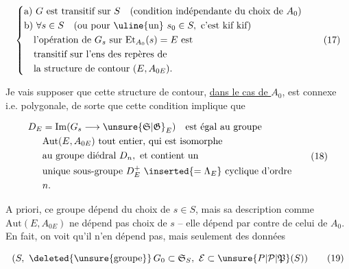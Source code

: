 \[
\left\{\begin{aligned}
 &\text{a) }G\text{ est transitif sur }S\quad\text{(condition indépendante du choix de }A_0\text{)}\\
 &\text{b) }\forall s\in S\quad\text{(ou pour \uline{un} }s_0\in S,\text{ c'est kif kif)}\\
 &\quad\text{l'opération de }G_s\text{ sur }\mathrm{Et}_{A_0}(s)=E\text{ est}\\
 &\quad\text{transitif sur l'ens des repères de}\\
 &\quad\text{la structure de contour }(E,A_{0E}).
\end{aligned}\right. \tag*{(17)}
\]

Je vais supposer que cette structure de contour,
\uline{dans le cas de $A_0$}, est connexe i.e. polygonale,
de sorte que cette condition implique que

\[
\begin{aligned}
 D_E&=\mathrm{Im}(G_s\longrightarrow\unsure{\mathfrak S|\mathfrak G}_E)\quad\text{est égal au groupe}\\
 &\mathrm{Aut}(E,A_{0E})\text{ tout entier, qui est isomorphe}\\
 &\text{au groupe diédral }D_n,\text{ et contient un}\\
 &\text{unique sous-groupe }D_E^+\ \inserted{=\Lambda_E}\ \text{cyclique d'ordre}\\
 &n.
\end{aligned}\tag*{(18)}
\]

A priori,  ce groupe dépend du choix de $s\in S$, mais
sa description comme $\mathrm{Aut}(E,A_{0E})$ ne dépend
pas  choix de $s$ -- elle dépend par contre de
celui de $A_0$. En fait, on voit qu'il n'en
dépend pas, mais seulement des données

\[
 (S,\ \deleted{\unsure{\text{groupe}}}\,G_0\subset\mathfrak S_S,\ \mathcal E\subset\unsure{P|\mathcal P|\mathfrak P}(S)) \tag*{(19)}
\]

